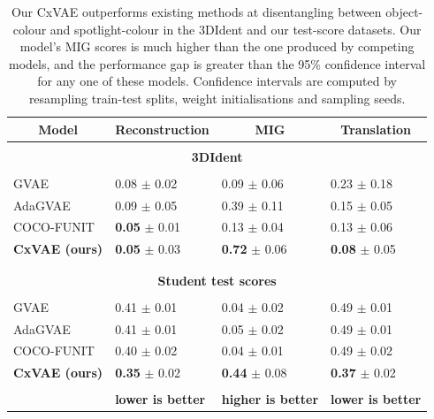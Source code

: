 \documentclass{article} %
\newcommand{\change}[1]{#1}
\begin{document}
\begin{table}[t]
\caption{\change{Our CxVAE outperforms existing methods at disentangling between object-colour and spotlight-colour in the 3DIdent \citep{Zimmerman2021Contrastive} and our test-score datasets. Our model's MIG scores is much higher than the one produced by competing models, and the performance gap is greater than the 95\% confidence interval for any one of these models. Confidence intervals are computed by resampling train-test splits, weight initialisations and sampling seeds.}}
\label{table:results}
\begin{center}
\begin{tabular}{llll}
\multicolumn{1}{c}{\sc Model}  & \multicolumn{1}{c}{\sc Reconstruction} & \multicolumn{1}{c}{\sc MIG} & \multicolumn{1}{c}{\sc Translation}
\\ \hline \\
\multicolumn{4}{c}{\bf 3DIdent \citep{Zimmerman2021Contrastive}} \\
\hline \\
GVAE \citep{Hosoya2019GroupbasedLO} & 0.08 $\pm$ 0.02 & 0.09 $\pm$ 0.06 & 0.23 $\pm$ 0.18 \\
AdaGVAE \citep{Locatello2020WeaklySupervisedDW} & 0.09 $\pm$ 0.05 & 0.39 $\pm$ 0.11 & 0.15 $\pm$ 0.05\\ 
COCO-FUNIT \citep{Saito2020Coco} & \textbf{0.05} $\pm$ 0.01 & 0.13 $\pm$ 0.04 & 0.13 $\pm$ 0.06\\
\textbf{CxVAE (ours)} & \textbf{0.05} $\pm$ 0.03 & \textbf{0.72} $\pm$ 0.06 & \textbf{0.08} $\pm$ 0.05\\
\\ \hline \\
\multicolumn{4}{c}{\bf Student test scores} \\
\hline \\
GVAE \citep{Hosoya2019GroupbasedLO} & 0.41 $\pm$ 0.01 & 0.04 $\pm$ 0.02 & 0.49 $\pm$ 0.01 \\
AdaGVAE \citep{Locatello2020WeaklySupervisedDW} & 0.41 $\pm$ 0.01 & 0.05 $\pm$ 0.02 & 0.49 $\pm$ 0.01\\ 
COCO-FUNIT \citep{Saito2020Coco} & 0.40 $\pm$ 0.02 & 0.04 $\pm$ 0.01 & 0.49 $\pm$ 0.02\\
\textbf{CxVAE (ours)} & \textbf{0.35} $\pm$ 0.02 & \textbf{0.44} $\pm$ 0.08 & \textbf{0.37} $\pm$ 0.02\\
\\ \hline
& \bf lower is better & \bf higher is better & \bf lower is better \\
\hline
\end{tabular}
\end{center}
\end{table}
\end{document}
